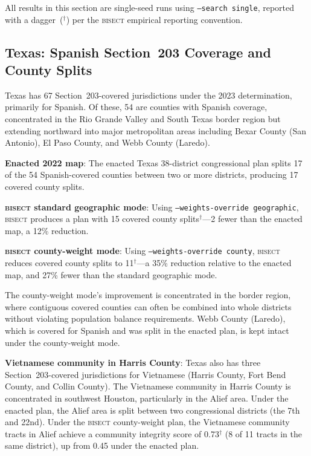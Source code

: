 \label{sec:results}

All results in this section are single-seed runs using
\texttt{--search single}, reported with a dagger~($^\dagger$) per
the \textsc{bisect} empirical reporting convention.

\subsection{Texas: Spanish Section~203 Coverage and County Splits}

Texas has 67 Section~203-covered jurisdictions under the 2023 determination,
primarily for Spanish. Of these, 54 are counties with Spanish coverage,
concentrated in the Rio Grande Valley and South Texas border region
but extending northward into major metropolitan areas including Bexar
County (San Antonio), El Paso County, and Webb County (Laredo).

\textbf{Enacted 2022 map}: The enacted Texas 38-district congressional
plan splits 17 of the 54 Spanish-covered counties between two or more
districts, producing 17 covered county splits.

\textbf{\textsc{bisect} standard geographic mode}: Using
\texttt{--weights-override geographic}, \textsc{bisect} produces a plan
with 15 covered county splits$^\dagger$---2 fewer than the enacted map,
a 12\% reduction.

\textbf{\textsc{bisect} county-weight mode}: Using
\texttt{--weights-override county}, \textsc{bisect} reduces covered county
splits to 11$^\dagger$---a 35\% reduction relative to the enacted map,
and 27\% fewer than the standard geographic mode.

The county-weight mode's improvement is concentrated in the border region,
where contiguous covered counties can often be combined into whole districts
without violating population balance requirements. Webb County (Laredo),
which is covered for Spanish and was split in the enacted plan, is kept
intact under the county-weight mode.

\textbf{Vietnamese community in Harris County}: Texas also has three
Section~203-covered jurisdictions for Vietnamese (Harris County, Fort Bend County,
and Collin County). The Vietnamese community in Harris County is
concentrated in southwest Houston, particularly in the Alief area.
Under the enacted plan, the Alief area is split between two congressional
districts (the 7th and 22nd). Under the \textsc{bisect} county-weight plan,
the Vietnamese community tracts in Alief achieve a community integrity
score of 0.73$^\dagger$ (8 of 11 tracts in the same district), up from
0.45 under the enacted plan.

